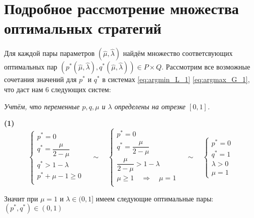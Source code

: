 \section{Подробное рассмотрение множества оптимальных стратегий}

Для каждой пары параметров $(\hat \mu, \hat \lambda)$ найдём множество
соответсвующих оптимальных пар 
$(p^*(\hat \mu, \hat \lambda), q^*(\hat \mu, \hat \lambda)) \in P \times Q$. 
Рассмотрим все возможные сочетания значений для $p^*$ и $q^*$ в системах 
\eqref{eq:argmin_L_1} \eqref{eq:argmax_G_1}, что даст нам 6 следующих систем:

\hspace{5mm}

	\textit{Учтём, что переменные $p, q, \mu$ и $\lambda$ определены на отрезке $[0, 1]$.}
	
\textbf{(1)}
$$
	\begin{cases}
		p^* = 0 \\
		q^* = \dfrac{\mu}{2 - \mu} \\
		q^* > 1 - \lambda \\
		p^* + \mu - 1 \geqslant 0 \\
	\end{cases}
	\quad \sim \quad
	\begin{cases}
		p^* = 0 \\
		q^* = \dfrac{\mu}{2 - \mu} \\
		\dfrac{\mu}{2 - \mu} > 1 - \lambda \\
		\mu \geqslant 1 \quad \Rightarrow \quad \mu = 1 \\
	\end{cases}
	\quad \sim \quad
	\begin{cases}
		p^* = 0 \\
		q^* = 1 \\
		\lambda > 0 \\
		\mu = 1
	\end{cases}
$$

Значит при $\mu = 1$  и $\lambda \in (0,1]$ имеем следующие оптимальные пары:
$(p^*, q^*) \in (0, 1)$

\hspace{5mm}

